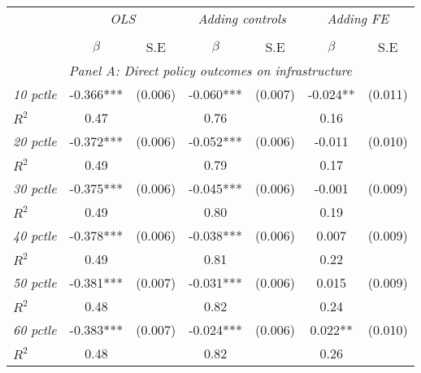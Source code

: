 \begin{tabular}{lcccccc}


\hline
\hline


\multicolumn{1}{l}{} & \multicolumn{2}{c}{\textit{OLS}} & \multicolumn{2}{c}{\textit{Adding controls}} & \multicolumn{2}{c}{\textit{Adding FE}}   \\ 
\cmidrule(l{1mm}r{1mm}){2-3} \cmidrule(l{1mm}r{1mm}){4-5} \cmidrule(l{1mm}r{1mm}){6-7}   \\
& $\beta$ & S.E & $\beta$ & S.E & $\beta$ & S.E \\
\hline

\multicolumn{7}{c}{\textit{Panel   A: Direct policy outcomes on infrastructure}}   \\                                                          

\textit{10 pctle}          		  &  -0.366***    & (0.006)      &   -0.060***        &  (0.007)      &     -0.024**  &    (0.011)        \\
$R^{2}$			           	   		  &  0.47   & 	   &     0.76   	&		 &     0.16   &   \\
									  
\textit{20 pctle}          		  &  -0.372***    & (0.006)      &   -0.052***        &  (0.006)      &     -0.011  &    (0.010)      \\
$R^{2}$			           	   		  &  0.49   & 	   &     0.79   	&		 &     0.17   &   \\
									  
\textit{30 pctle}          		  &  -0.375***    & (0.006)      &   -0.045***        &  (0.006)      &     -0.001  &    (0.009)      \\
$R^{2}$			           	   		  &  0.49   & 	   &     0.80   	&		 &     0.19   &   \\
									  
\textit{40 pctle}          		  &  -0.378***    & (0.006)      &   -0.038***        &  (0.006)      &     0.007  &    (0.009)      \\
$R^{2}$			           	   		  &  0.49   & 	   &     0.81   	&		 &     0.22   &  \\
									  
\textit{50 pctle}          		  &  -0.381***    & (0.007)      &   -0.031***        &  (0.006)      &     0.015  &    (0.009)       \\
$R^{2}$			           	   		  &  0.48   & 	   &     0.82   	&		 &     0.24   &   \\

\textit{60 pctle}          		  &  -0.383***    & (0.007)      &   -0.024***        &  (0.006)      &     0.022**  &    (0.010)       \\
$R^{2}$			           	   		  &  0.48   & 	   &     0.82   	&		 &     0.26   &  \\



\end{tabular}
